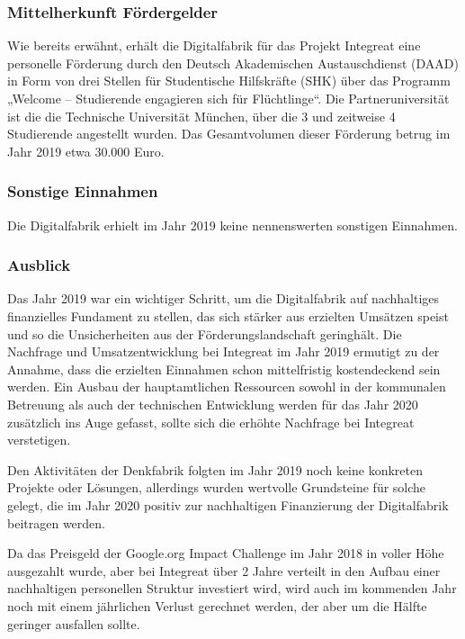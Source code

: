 \documentclass[12pt, a4paper]{article} %
\begin{document}
\hypertarget{mittelherkunft-fuxf6rdergelder}{%
\subsubsection{Mittelherkunft
Fördergelder}\label{mittelherkunft-fuxf6rdergelder}}

Wie bereits erwähnt, erhält die Digitalfabrik für das Projekt Integreat
eine personelle Förderung durch den Deutsch Akademischen Austauschdienst
(DAAD) in Form von drei Stellen für Studentische Hilfskräfte (SHK) über
das Programm „Welcome – Studierende engagieren sich für Flüchtlinge“.
Die Partneruniversität ist die die Technische Universität München, über
die 3 und zeitweise 4 Studierende angestellt wurden. Das Gesamtvolumen
dieser Förderung betrug im Jahr 2019 etwa 30.000 Euro.

\hypertarget{sonstige-einnahmen}{%
\subsubsection{Sonstige Einnahmen}\label{sonstige-einnahmen}}

Die Digitalfabrik erhielt im Jahr 2019 keine nennenswerten sonstigen
Einnahmen.

\hypertarget{ausblick}{%
\subsubsection{Ausblick}\label{ausblick}}

Das Jahr 2019 war ein wichtiger Schritt, um die Digitalfabrik auf
nachhaltiges finanzielles Fundament zu stellen, das sich stärker aus
erzielten Umsätzen speist und so die Unsicherheiten aus der
Förderungslandschaft geringhält. Die Nachfrage und Umsatzentwicklung bei
Integreat im Jahr 2019 ermutigt zu der Annahme, dass die erzielten
Einnahmen schon mittelfristig kostendeckend sein werden. Ein Ausbau der
hauptamtlichen Ressourcen sowohl in der kommunalen Betreuung als auch
der technischen Entwicklung werden für das Jahr 2020 zusätzlich ins Auge
gefasst, sollte sich die erhöhte Nachfrage bei Integreat verstetigen.

Den Aktivitäten der Denkfabrik folgten im Jahr 2019 noch keine konkreten
Projekte oder Lösungen, allerdings wurden wertvolle Grundsteine für
solche gelegt, die im Jahr 2020 positiv zur nachhaltigen Finanzierung
der Digitalfabrik beitragen werden.

Da das Preisgeld der Google.org Impact Challenge im Jahr 2018 in voller
Höhe ausgezahlt wurde, aber bei Integreat über 2 Jahre verteilt in den
Aufbau einer nachhaltigen personellen Struktur investiert wird, wird
auch im kommenden Jahr noch mit einem jährlichen Verlust gerechnet
werden, der aber um die Hälfte geringer ausfallen sollte.
\end{document}
